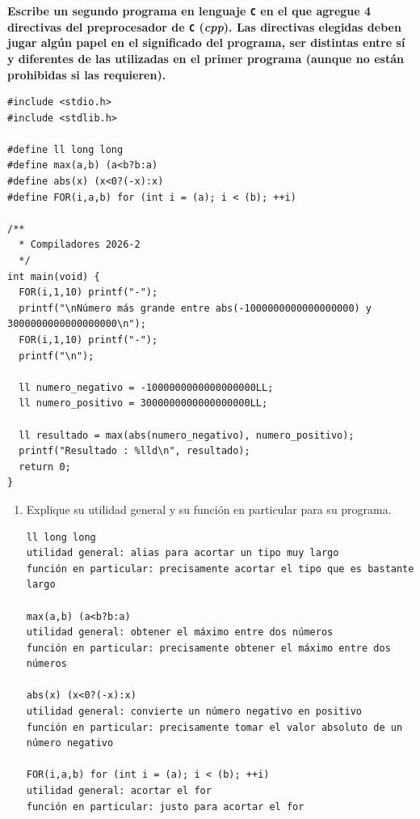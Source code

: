 \documentclass[11pt]{report}
\begin{document}
\textbf{Escribe un segundo programa en lenguaje \texttt{C} en el que agregue 4 directivas del preprocesador
de \texttt{C} (\textit{cpp}). Las directivas elegidas deben jugar algún papel en el significado del programa,
ser distintas entre sí y diferentes de las utilizadas en el primer programa (aunque no están prohibidas si las requieren).}

\begin{verbatim}
#include <stdio.h>
#include <stdlib.h>

#define ll long long
#define max(a,b) (a<b?b:a)
#define abs(x) (x<0?(-x):x)
#define FOR(i,a,b) for (int i = (a); i < (b); ++i)

/**
  * Compiladores 2026-2
  */
int main(void) {
  FOR(i,1,10) printf("-");
  printf("\nNúmero más grande entre abs(-1000000000000000000) y 3000000000000000000\n");
  FOR(i,1,10) printf("-");
  printf("\n");

  ll numero_negativo = -1000000000000000000LL;
  ll numero_positivo = 3000000000000000000LL;

  ll resultado = max(abs(numero_negativo), numero_positivo);
  printf("Resultado : %lld\n", resultado);
  return 0;
}
\end{verbatim}

\begin{enumerate}[label=\alph*.]
  \item Explique su utilidad general y su función en particular para su programa.
\begin{verbatim}
ll long long
utilidad general: alias para acortar un tipo muy largo
función en particular: precisamente acortar el tipo que es bastante largo

max(a,b) (a<b?b:a)
utilidad general: obtener el máximo entre dos números
función en particular: precisamente obtener el máximo entre dos números

abs(x) (x<0?(-x):x)
utilidad general: convierte un número negativo en positivo
función en particular: precisamente tomar el valor absoluto de un número negativo

FOR(i,a,b) for (int i = (a); i < (b); ++i)
utilidad general: acortar el for
función en particular: justo para acortar el for
\end{verbatim}
\end{enumerate}
\end{document}
